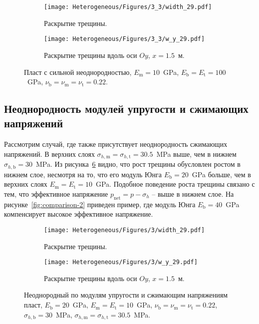 \begin{figure}[htbp]
    \centering
    \begin{subfigure}[t]{0.4\textwidth}
        \centering
        \caption{Раскрытие трещины.}
        \label{fig:heterogeneous-3layer-planar}
        \texttt{[image: Heterogeneous/Figures/3\_3/width\_29.pdf]}
    \end{subfigure}
    \hfill 
    \begin{subfigure}[t]{0.55\textwidth}
        \centering
        \caption{Раскрытие трещины вдоль оси $Oy$, $x=1.5$~м.}
        \label{fig:heterogeneous-3layer-slice}
        \texttt{[image: Heterogeneous/Figures/3\_3/w\_y\_29.pdf]}
    \end{subfigure}
    \caption{Пласт с сильной неоднородностью, $E_\text{m} = 10$~GPa, $E_\text{b} = E_\text{t} = 100$~GPa, $\nu_\text{b} = \nu_\text{m} = \nu_\text{t} = 0.22$.}
    \label{fig:heterogeneous-3layer}
\end{figure}



\subsection{Неоднородность модулей упругости и сжимающих напряжений}
Рассмотрим случай, где также присутствует неоднородность сжимающих напряжений. В верхних слоях $\sigma_{h,\text{m}} = \sigma_{h,\text{t}} = 30.5$~MPa выше, чем в нижнем $\sigma_{h,\text{b}} = 30$~MPa. Из рисунка~\ref{fig:comparison-1} видно, что рост трещины обусловлен ростом в нижнем слое, несмотря на то, что его модуль Юнга $E_\text{b} = 20$~GPa больше, чем в верхних слоях $E_\text{m} = E_\text{t} = 10$~GPa. Подобное поведение роста трещины связано с тем, что эффективное напряжение $p_\text{net} = p - \sigma_h$ -- выше в нижнем слое. На рисунке~\ref{fig:comparison-2} приведен пример, где модуль Юнга $E_\text{b} = 40$~GPa компенсирует высокое эффективное напряжение.

\begin{figure}[htbp]
    \centering
    \begin{subfigure}[t]{0.4\textwidth}
        \centering
        \caption{Раскрытие трещины.}
        \label{fig:comparison-1-planar}
        \texttt{[image: Heterogeneous/Figures/3/width\_29.pdf]}
    \end{subfigure}
    \hfill 
    \begin{subfigure}[t]{0.55\textwidth}
        \centering
        \caption{Раскрытие трещины вдоль оси $Oy$, $x=1.5$~м.}
        \label{fig:comparison-1-slice}
        \texttt{[image: Heterogeneous/Figures/3/w\_y\_29.pdf]}
    \end{subfigure}
    \caption{Неоднородный по модулям упругости и сжимающим напряжениям пласт, $E_\text{b} = 20$~GPa, $E_\text{m} = E_\text{t} = 10$~GPa, $\nu_\text{b} = \nu_\text{m} = \nu_\text{t} = 0.22$, $\sigma_{h,\text{b}} = 30$~MPa, $\sigma_{h,\text{m}} = \sigma_{h,\text{t}} = 30.5$~MPa.}
    \label{fig:comparison-1}
\end{figure}


